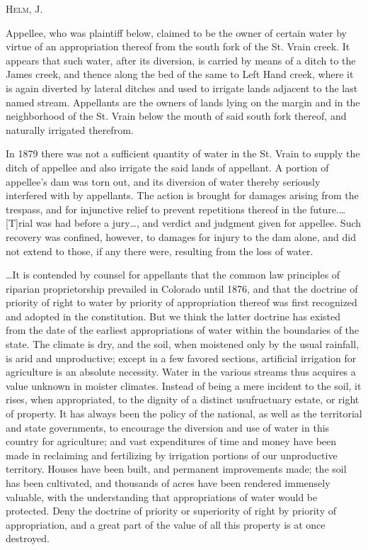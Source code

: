 

\opinion \textsc{Helm, J}.

Appellee, who was plaintiff below, claimed to be the owner of certain water by
virtue of an appropriation thereof from the south fork of the St. Vrain creek.
It appears that such water, after its diversion, is carried by means of a ditch
to the James creek, and thence along the bed of the same to Left Hand creek,
where it is again diverted by lateral ditches and used to irrigate lands
adjacent to the last named stream. Appellants are the owners of lands lying on
the margin and in the neighborhood of the St. Vrain below the mouth of said
south fork thereof, and naturally irrigated therefrom.

In 1879 there was not a sufficient quantity of water in the St. Vrain to supply
the ditch of appellee and also irrigate the said lands of appellant. A portion
of appellee's dam was torn out, and its diversion of water thereby seriously
interfered with by appellants. The action is brought for damages arising from
the trespass, and for injunctive relief to prevent repetitions thereof in the
future.\ldots [T]rial was had before a jury\ldots , and verdict and judgment
given for appellee. Such recovery was confined, however, to damages for injury
to the dam alone, and did not extend to those, if any there were, resulting from
the loss of water.

\ldots It is contended by counsel for appellants that the common law principles
of riparian proprietorship prevailed in Colorado until 1876, and that the
doctrine of priority of right to water by priority of appropriation thereof was
first recognized and adopted in the constitution. But we think the latter
doctrine has existed from the date of the earliest appropriations of water
within the boundaries of the state. The climate is dry, and the soil, when
moistened only by the usual rainfall, is arid and unproductive; except in a few
favored sections, artificial irrigation for agriculture is an absolute
necessity. Water in the various streams thus acquires a value unknown in moister
climates. Instead of being a mere incident to the soil, it rises, when
appropriated, to the dignity of a distinct usufructuary estate, or right of
property. It has always been the policy of the national, as well as the
territorial and state governments, to encourage the diversion and use of water
in this country for agriculture; and vast expenditures of time and money have
been made in reclaiming and fertilizing by irrigation portions of our
unproductive territory. Houses have been built, and permanent improvements made;
the soil has been cultivated, and thousands of acres have been rendered
immensely valuable, with the understanding that appropriations of water would be
protected. Deny the doctrine of priority or superiority of right by priority of
appropriation, and a great part of the value of all this property is at once
destroyed.

